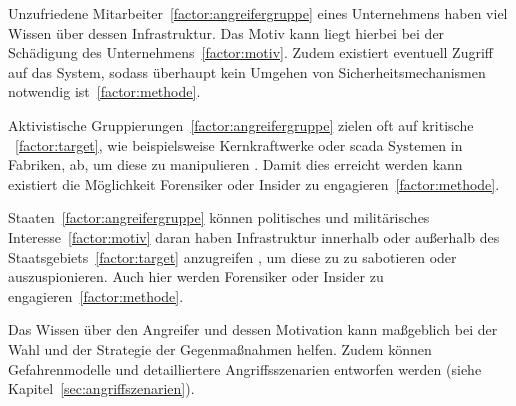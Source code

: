 Unzufriedene Mitarbeiter~\ref{factor:angreifergruppe} eines Unternehmens haben viel Wissen über dessen Infrastruktur.
Das Motiv kann liegt hierbei bei der Schädigung des Unternehmens~\ref{factor:motiv}.
Zudem existiert eventuell Zugriff auf das System, sodass überhaupt kein Umgehen von Sicherheitsmechanismen notwendig ist~\ref{factor:methode}.~\cite{CAS+09,WYX+10}

Aktivistische Gruppierungen~\ref{factor:angreifergruppe} zielen oft auf kritische \cps~\ref{factor:target}, wie beispielsweise Kernkraftwerke oder \gls{scada} Systemen in Fabriken, ab, um diese zu manipulieren \cite{CAS+09,HLL+17}. 
Damit dies erreicht werden kann existiert die Möglichkeit Forensiker oder Insider zu engagieren~\ref{factor:methode}.~\cite{WYX+10}

Staaten~\ref{factor:angreifergruppe} können politisches und militärisches Interesse~\ref{factor:motiv} daran haben Infrastruktur innerhalb oder außerhalb des Staatsgebiets~\ref{factor:target} anzugreifen \cite{CAS+09}, um diese zu zu sabotieren oder auszuspionieren.
Auch hier werden Forensiker oder Insider zu engagieren~\ref{factor:methode}.

Das Wissen über den Angreifer und dessen Motivation kann maßgeblich bei der Wahl und der Strategie der Gegenmaßnahmen helfen.
Zudem können Gefahrenmodelle und detailliertere Angriffsszenarien entworfen werden (siehe Kapitel~\ref{sec:angriffszenarien}).
